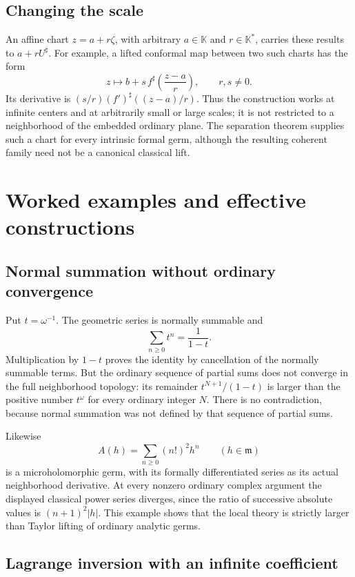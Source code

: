 \documentclass[11pt,letterpaper]{article}
\numberwithin{equation}{section}
\theoremstyle{definition}
\theoremstyle{remark}
\newcommand{\K}{\mathbb K}
\newcommand{\mm}{\mathfrak m}
\begin{document}
\subsection{Changing the scale}

An affine chart $z=a+r\zeta$, with arbitrary $a\in\K$ and
$r\in\K^*$, carries these results to $a+rU^\sharp$. For example,
a lifted conformal map between two such charts has the form
\[
 z\longmapsto b+s\,f^\sharp\!\left(\frac{z-a}{r}\right),
 \qquad r,s\ne0.
\]
Its derivative is $(s/r)(f')^\sharp((z-a)/r)$. Thus the construction
works at infinite centers and at arbitrarily small or large scales;
it is not restricted to a neighborhood of the embedded ordinary plane.
The separation theorem supplies such a chart for every intrinsic formal
germ, although the resulting coherent family need not be a canonical
classical lift.

\section{Worked examples and effective constructions}
\label{sec:examples}

\subsection{Normal summation without ordinary convergence}

Put $t=\omega^{-1}$. The geometric series is normally summable and
\[
 \sum_{n\ge0}t^n=\frac1{1-t}.
\]
Multiplication by $1-t$ proves the identity by cancellation of the
normally summable terms. But the ordinary sequence of partial sums
does not converge in the full neighborhood topology: its remainder
$t^{N+1}/(1-t)$ is larger than the positive number $t^\omega$ for
every ordinary integer $N$. There is no contradiction, because normal
summation was not defined by that sequence of partial sums.

Likewise
\[
 A(h)=\sum_{n\ge0}(n!)^2h^n\qquad(h\in\mm)
\]
is a microholomorphic germ, with its formally differentiated series as
its actual neighborhood derivative. At every nonzero ordinary complex
argument the displayed classical power series diverges, since the
ratio of successive absolute values is $(n+1)^2|h|$. This example
shows that the local theory is strictly larger than Taylor lifting of
ordinary analytic germs.

\subsection{Lagrange inversion with an infinite coefficient}
\end{document}
